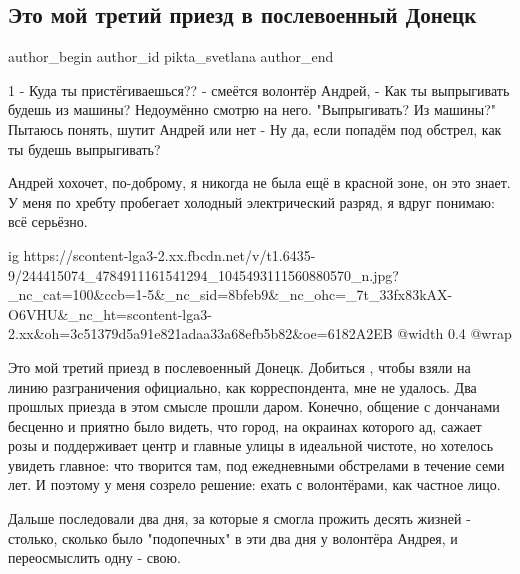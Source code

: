  
 
 
 
 
 
\subsection{Это мой третий приезд в послевоенный Донецк}
\label{sec:04_10_2021.fb.pikta_svetlana.1.doneck_poezdka}
 
\ifcmt
 author_begin
   author_id pikta_svetlana
 author_end
\fi

1
- Куда ты пристёгиваешься?? - смеётся волонтёр Андрей, - Как ты выпрыгивать будешь из машины?
Недоумённо смотрю на него. "Выпрыгивать? Из машины?" 
Пытаюсь понять, шутит Андрей или нет
- Ну да, если попадём под обстрел, как ты будешь выпрыгивать?

Андрей хохочет, по-доброму, я никогда не была ещё в красной зоне, он это знает.
У меня по хребту пробегает холодный электрический разряд, я вдруг понимаю: всё
серьёзно. 

\ifcmt
  ig https://scontent-lga3-2.xx.fbcdn.net/v/t1.6435-9/244415074_4784911161541294_1045493111560880570_n.jpg?_nc_cat=100&ccb=1-5&_nc_sid=8bfeb9&_nc_ohc=_7t_33fx83kAX-O6VHU&_nc_ht=scontent-lga3-2.xx&oh=3c51379d5a91e821adaa33a68efb5b82&oe=6182A2EB
  @width 0.4
  @wrap 
\fi

Это мой третий приезд в послевоенный Донецк. Добиться , чтобы взяли на линию
разграничения официально, как корреспондента, мне не удалось. Два прошлых
приезда в этом смысле прошли даром. Конечно, общение с дончанами бесценно и
приятно было видеть, что город, на окраинах которого ад, сажает розы и
поддерживает центр и главные улицы в идеальной чистоте, но хотелось увидеть
главное: что творится там, под ежедневными обстрелами в течение семи лет. И
поэтому у меня созрело решение: ехать с волонтёрами, как частное лицо. 

Дальше последовали два дня, за которые я смогла прожить десять жизней -
столько, сколько было "подопечных" в эти два дня у волонтёра Андрея, и
переосмыслить одну - свою. 

